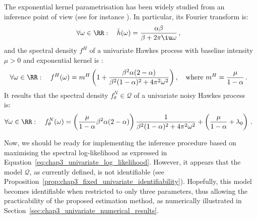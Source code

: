           The exponential kernel parametrisation has been widely studied from an inference point of view (see for instance \textcite{Ozaki1979, Bacry2016}).
          In particular, its Fourier transform is:
          \begin{equation}\label{eq:chap3_fourier_exponential}
            \forall \omega \in \RR: \quad
            \tilde h(\omega) = \frac{\alpha \beta}{\beta + 2 \pi \iu \omega} \,,
          \end{equation}
          and the spectral density $f^H$ of a univariate Hawkes process
          with baseline intensity $\mu > 0$ and exponential kernel
          is \parencite{Hawkes1971}:
          \[
            \forall \omega \in \RR: \quad
            f^H(\omega) = m^H \left(1 + \frac{\beta^2 \alpha (2 - \alpha)}{\beta^2 (1 - \alpha)^2 + 4 \pi^2 \omega^2}\right), \quad
            \text{where } m^H = \frac{\mu}{1 - \alpha}\,.
          \]
          It results that the spectral density $f_\theta^N \in \mathcal Q$ of a univariate noisy Hawkes process is:          
          \begin{equation}\label{eq:chap3_exponential_spectral_density}
            \forall \omega \in \RR: \quad
          	f_{\theta}^N(\omega) = \left( \frac{\mu}{1-\alpha}{\beta^2 \alpha (2-\alpha)} \right)
          	\frac{1}{\beta^2 (1-\alpha)^2 + 4 \pi^2 \omega^2}
          	+ \left(\frac{\mu}{1-\alpha} + \lambda_0\right)\,.
          \end{equation}
        
        Now, we should be ready for implementing the inference procedure based on maximising the spectral log-likelihood as expressed in Equation~\eqref{eq:chap3_univariate_log_likelihood}.
        However, it appears that the model $\mathcal Q$, as currently defined, is not identifiable (see Proposition~\ref{prop:chap3_fixed_univariate_identifiability}).
        Hopefully, this model becomes identifiable when restricted to only three parameters, thus allowing the practicability of the proposed estimation method,
        as numerically illustrated in Section~\ref{sec:chap3_univariate_numerical_results}.
        
